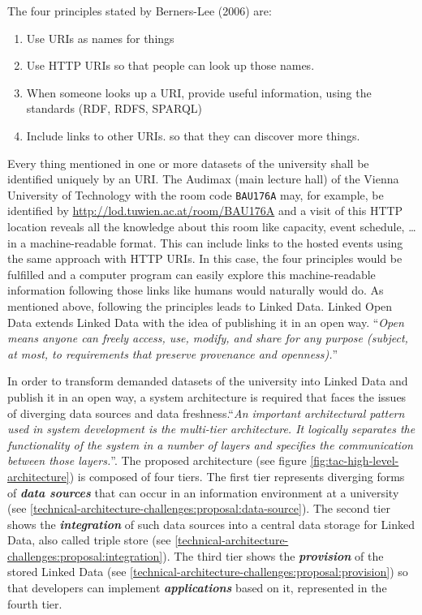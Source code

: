 \documentclass{article}
\begin{document}
The four principles stated by Berners-Lee (2006)\cite{artivle:bernerslee-t-2006-1} are:
\begin{enumerate}
	\item Use URIs as names for things
	\item Use HTTP URIs so that people can look up those names.
	\item When someone looks up a URI, provide useful information, using the standards (RDF, RDFS, SPARQL)
	\item Include links to other URIs. so that they can discover more things.
\end{enumerate}
Every thing mentioned in one or more datasets of the university shall be identified uniquely by an URI. The Audimax (main lecture hall) of the Vienna University of Technology with the room code \texttt{BAU176A} may, for example, be identified by \url{http://lod.tuwien.ac.at/room/BAU176A} and a visit of this HTTP location reveals all the knowledge about this room like capacity, event schedule, \ldots in a machine-readable format. This can include links to the hosted events using the same approach with HTTP URIs. In this case, the four principles would be fulfilled and a computer program can easily explore this machine-readable information following those links like humans would naturally would do. As mentioned above, following the principles leads to Linked Data. Linked Open Data extends Linked Data with the idea of publishing it in an open way.
``\textit{Open means anyone can freely access, use, modify, and share for any purpose (subject, at most, to requirements that preserve provenance and openness).}''\cite{_open_????}

In order to transform demanded datasets of the university into Linked Data and publish it in an open way, a system architecture is required that faces the issues of diverging data sources and data freshness.``\textit{An important architectural pattern used in system development is the multi-tier architecture. It logically separates the functionality of the system in a number of layers and specifies the communication between those layers.}''\cite{simperl_using_2013}. The proposed architecture (see figure \ref{fig:tac-high-level-architecture}) is composed of four tiers. The first tier represents diverging forms of \textbf{\textit{data sources}} that can occur in an information environment at a university (see \ref{technical-architecture-challenges:proposal:data-source}). The second tier shows the \textbf{\textit{integration}} of such data sources into a central data storage for Linked Data, also called triple store (see \ref{technical-architecture-challenges:proposal:integration}). The third tier shows the \textbf{\textit{provision}} of the stored Linked Data (see \ref{technical-architecture-challenges:proposal:provision}) so that developers can implement \textbf{\textit{applications}} based on it, represented in the fourth tier.  
\end{document}
